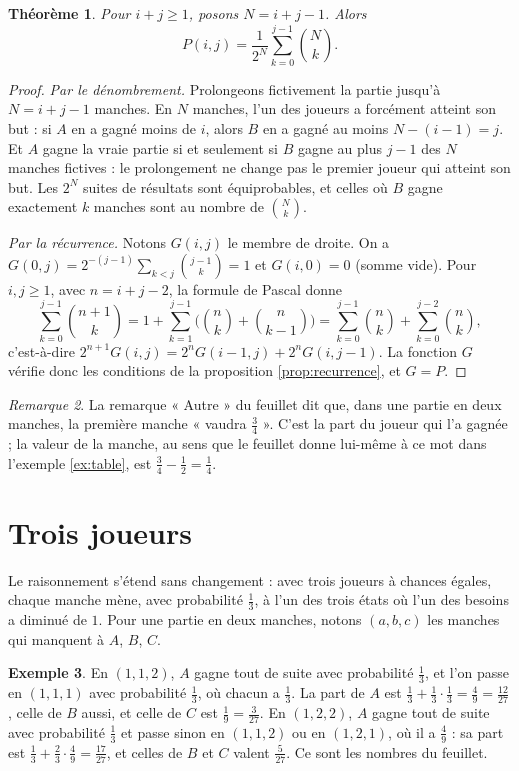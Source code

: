 \documentclass[11pt,a4paper]{article}
\theoremstyle{plain}
\newtheorem{theoreme}{Théorème}[section]
\theoremstyle{definition}
\newtheorem{exemple}[theoreme]{Exemple}
\theoremstyle{remark}
\newtheorem{remarque}[theoreme]{Remarque}
\begin{document}
\begin{theoreme}\label{thm:partis}
Pour $i+j\geq1$, posons $N=i+j-1$. Alors
\[
  P(i,j)=\frac1{2^N}\sum_{k=0}^{j-1}\binom Nk .
\]
\end{theoreme}

\begin{proof}
\emph{Par le dénombrement.} Prolongeons fictivement la partie jusqu'à $N=i+j-1$ manches. En $N$ manches, l'un des joueurs a forcément atteint son but : si $A$ en a gagné moins de $i$, alors $B$ en a gagné au moins $N-(i-1)=j$. Et $A$ gagne la vraie partie si et seulement si $B$ gagne au plus $j-1$ des $N$ manches fictives : le prolongement ne change pas le premier joueur qui atteint son but. Les $2^N$ suites de résultats sont équiprobables, et celles où $B$ gagne exactement $k$ manches sont au nombre de $\binom Nk$.

\emph{Par la récurrence.} Notons $G(i,j)$ le membre de droite. On a $G(0,j)=2^{-(j-1)}\sum_{k<j}\binom{j-1}k=1$ et $G(i,0)=0$ (somme vide). Pour $i,j\geq1$, avec $n=i+j-2$, la formule de Pascal donne
\[
  \sum_{k=0}^{j-1}\binom{n+1}k=1+\sum_{k=1}^{j-1}\Big(\binom nk+\binom n{k-1}\Big)=\sum_{k=0}^{j-1}\binom nk+\sum_{k=0}^{j-2}\binom nk ,
\]
c'est-à-dire $2^{n+1}G(i,j)=2^nG(i-1,j)+2^nG(i,j-1)$. La fonction $G$ vérifie donc les conditions de la proposition \ref{prop:recurrence}, et $G=P$.
\end{proof}

\begin{remarque}
La remarque « Autre » du feuillet dit que, dans une partie en deux manches, la première manche « vaudra $\frac34$ ». C'est la part du joueur qui l'a gagnée ; la valeur de la manche, au sens que le feuillet donne lui-même à ce mot dans l'exemple \ref{ex:table}, est $\frac34-\frac12=\frac14$.
\end{remarque}

\section{Trois joueurs}

Le raisonnement s'étend sans changement : avec trois joueurs à chances égales, chaque manche mène, avec probabilité $\frac13$, à l'un des trois états où l'un des besoins a diminué de $1$. Pour une partie en deux manches, notons $(a,b,c)$ les manches qui manquent à $A$, $B$, $C$.

\begin{exemple}\label{ex:trois}
En $(1,1,2)$, $A$ gagne tout de suite avec probabilité $\frac13$, et l'on passe en $(1,1,1)$ avec probabilité $\frac13$, où chacun a $\frac13$. La part de $A$ est $\frac13+\frac13\cdot\frac13=\frac4{9}=\frac{12}{27}$, celle de $B$ aussi, et celle de $C$ est $\frac19=\frac3{27}$. En $(1,2,2)$, $A$ gagne tout de suite avec probabilité $\frac13$ et passe sinon en $(1,1,2)$ ou en $(1,2,1)$, où il a $\frac4{9}$ : sa part est $\frac13+\frac23\cdot\frac49=\frac{17}{27}$, et celles de $B$ et $C$ valent $\frac{5}{27}$. Ce sont les nombres du feuillet.
\end{exemple}
\end{document}
